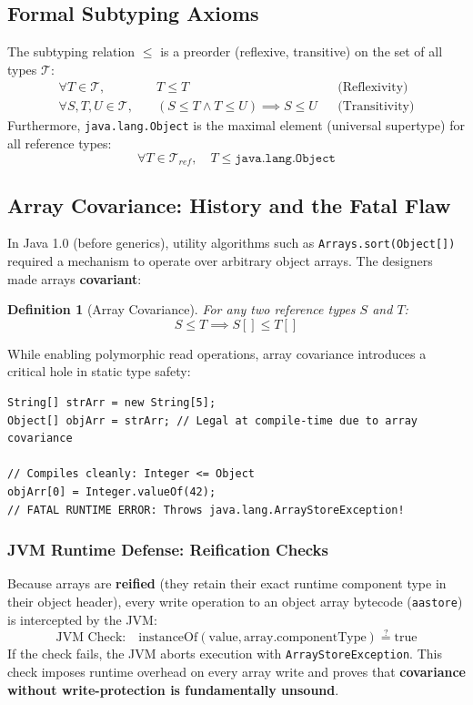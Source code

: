 \documentclass[10pt,journal,compsoc,onecolumn]{IEEEtran}
\newtheorem{definition}[theorem]{Definition}
\begin{document}
\subsection{Formal Subtyping Axioms}
The subtyping relation $\le$ is a preorder (reflexive, transitive) on the set of all types $\mathcal{T}$:
\begin{align}
\forall T \in \mathcal{T}, &\quad T \le T && \text{(Reflexivity)} \\
\forall S, T, U \in \mathcal{T}, &\quad (S \le T \land T \le U) \implies S \le U && \text{(Transitivity)}
\end{align}
Furthermore, \texttt{java.lang.Object} is the maximal element (universal supertype) for all reference types:
\begin{equation}
\forall T \in \mathcal{T}_{ref}, \quad T \le \texttt{java.lang.Object}
\end{equation}

\subsection{Array Covariance: History and the Fatal Flaw}
In Java 1.0 (before generics), utility algorithms such as \texttt{Arrays.sort(Object[])} required a mechanism to operate over arbitrary object arrays. The designers made arrays \textbf{covariant}:
\begin{definition}[Array Covariance]
For any two reference types $S$ and $T$:
\begin{equation}
S \le T \implies S[] \le T[]
\end{equation}
\end{definition}

While enabling polymorphic read operations, array covariance introduces a critical hole in static type safety:
\begin{lstlisting}[caption={The Runtime ArrayStoreException Catastrophe}]
String[] strArr = new String[5];
Object[] objArr = strArr; // Legal at compile-time due to array covariance

// Compiles cleanly: Integer <= Object
objArr[0] = Integer.valueOf(42); 
// FATAL RUNTIME ERROR: Throws java.lang.ArrayStoreException!
\end{lstlisting}

\subsubsection{JVM Runtime Defense: Reification Checks}
Because arrays are \textbf{reified} (they retain their exact runtime component type in their object header), every write operation to an object array bytecode (\texttt{aastore}) is intercepted by the JVM:
\begin{equation}
\text{JVM Check:} \quad \text{instanceOf}(\text{value}, \text{array}.\text{componentType}) \stackrel{?}{=} \text{true}
\end{equation}
If the check fails, the JVM aborts execution with \texttt{ArrayStoreException}. This check imposes runtime overhead on every array write and proves that \textbf{covariance without write-protection is fundamentally unsound}.
\end{document}

